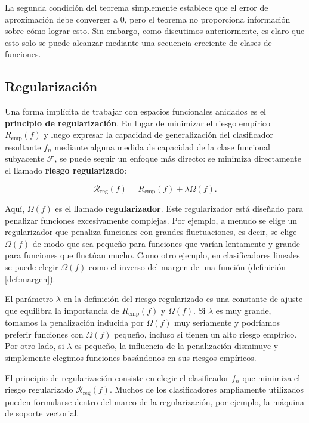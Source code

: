 \documentclass{report}
\begin{document}
La segunda condición del teorema simplemente establece que el error de aproximación debe converger a \(0\), pero 
el teorema no proporciona información sobre cómo lograr esto. Sin embargo, como discutimos anteriormente, es claro 
que esto solo se puede alcanzar mediante una secuencia creciente de clases de funciones.\newline

\subsection{Regularización}

Una forma implícita de trabajar con espacios funcionales anidados es el \textbf{principio de regularización}. 
En lugar de minimizar el riesgo empírico \(R_{\text{emp}}(f)\) y luego expresar la capacidad de generalización 
del clasificador resultante \(f_n\) mediante alguna medida de capacidad de la clase funcional subyacente 
\(\mathcal{F}\), se puede seguir un enfoque más directo: se minimiza directamente el llamado \textbf{riesgo 
regularizado}:

\[
\mathcal{R}_{\text{reg}}(f) = R_{\text{emp}}(f) + \lambda \Omega(f).
\]

Aquí, \(\Omega(f)\) es el llamado \textbf{regularizador}. Este regularizador está diseñado para penalizar 
funciones excesivamente complejas. Por ejemplo, a menudo se elige un regularizador que penaliza funciones con 
grandes fluctuaciones, es decir, se elige \(\Omega(f)\) de modo que sea pequeño para funciones que varían 
lentamente y grande para funciones que fluctúan mucho. Como otro ejemplo, en clasificadores lineales se puede 
elegir \(\Omega(f)\) como el inverso del margen de una función (definición \ref{def:margen}).\newline

El parámetro \(\lambda\) en la definición del riesgo regularizado es una constante de ajuste que equilibra la 
importancia de \(R_{\text{emp}}(f)\) y \(\Omega(f)\). Si \(\lambda\) es muy grande, tomamos la penalización 
inducida por \(\Omega(f)\) muy seriamente y podríamos preferir funciones con \(\Omega(f)\) pequeño, incluso si 
tienen un alto riesgo empírico. Por otro lado, si \(\lambda\) es pequeño, la influencia de la penalización 
disminuye y simplemente elegimos funciones basándonos en sus riesgos empíricos.\newline

El principio de regularización consiste en elegir el clasificador \(f_n\) que minimiza el riesgo regularizado 
\(\mathcal{R}_{\text{reg}}(f)\). Muchos de los clasificadores ampliamente utilizados pueden formularse dentro 
del marco de la regularización, por ejemplo, la máquina de soporte vectorial.\newline
\end{document}
